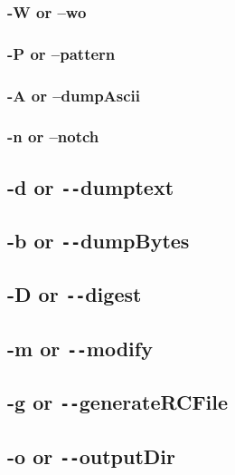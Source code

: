 \documentclass[letterpaper]{article}
\begin{document}
\subsubsection{-W or --wo}
\subsubsection{-P or --pattern}
\subsubsection{-A or --dumpAscii}
\subsubsection{-n or --notch}

\subsection{-d or \texttt{-{}-}dumptext}


\subsection{-b or \texttt{-{}-}dumpBytes}


\subsection{-D or \texttt{-{}-}digest}


\subsection{-m or \texttt{-{}-}modify}


\subsection{-g or \texttt{-{}-}generateRCFile}


\subsection{-o or \texttt{-{}-}outputDir}
\end{document}

